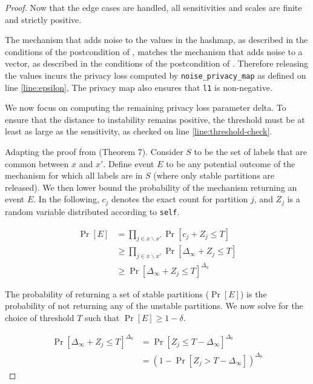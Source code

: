 \documentclass{article}
\begin{document}
\begin{proof}
    Now that the edge cases are handled, all sensitivities and scales are finite and strictly positive.

    The mechanism that adds noise to the values in the hashmap, as described in the conditions of the postcondition of , 
    matches the mechanism that adds noise to a vector, as described in the conditions of the postcondition of .
    Therefore releasing the values incurs the privacy loss computed by \texttt{noise\_privacy\_map} as defined on line \ref{line:epsilon},
    The privacy map also ensures that \texttt{l1} is non-negative.

    We now focus on computing the remaining privacy loss parameter delta.
    To ensure that the distance to instability remains positive, 
    the threshold must be at least as large as the sensitivity, as checked on line \ref{line:threshold-check}.

    Adapting the proof from \cite{rogers2023unifyingprivacyanalysisframework} (Theorem 7).
    Consider $S$ to be the set of labels that are common between $x$ and $x'$.
    Define event $E$ to be any potential outcome of the mechanism for which all labels are in $S$
    (where only stable partitions are released).
    We then lower bound the probability of the mechanism returning an event $E$.
    In the following, $c_j$ denotes the exact count for partition $j$,
    and $Z_j$ is a random variable distributed according to \texttt{self}.

    \begin{align*}
        \Pr[E] &= \prod_{j \in x \backslash x'} \Pr[c_j + Z_j \le T] \\
        &\ge \prod_{j \in x \backslash x'} \Pr[\Delta_\infty + Z_j \le T] \\
        &\ge \Pr[\Delta_\infty + Z_j \le T]^{\Delta_0}
    \end{align*}

    The probability of returning a set of stable partitions ($\Pr[E]$) 
    is the probability of not returning any of the unstable partitions.
    We now solve for the choice of threshold $T$ such that $\Pr[E] \ge 1 - \delta$.

    \begin{align*}
        \Pr[\Delta_\infty + Z_j \le T]^{\Delta_0} &= \Pr[Z_j \le T - \Delta_\infty]^{\Delta_0} \\
        &= (1 - \Pr[Z_j > T - \Delta_\infty])^{\Delta_0}
    \end{align*}


\end{proof}
\end{document}
